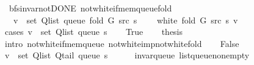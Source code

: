 \begin{isabellebody}
{\isafoldproof}%
%
\isadelimproof
\isanewline
%
\endisadelimproof
\isanewline
{}\isamarkupfalse%
\ {\isacharparenleft}{\kern0pt}\ bfs{\isacharunderscore}{\kern0pt}invar{\isacharunderscore}{\kern0pt}not{\isacharunderscore}{\kern0pt}DONE{\isacharparenright}{\kern0pt}\ not{\isacharunderscore}{\kern0pt}white{\isacharunderscore}{\kern0pt}if{\isacharunderscore}{\kern0pt}mem{\isacharunderscore}{\kern0pt}queue{\isacharunderscore}{\kern0pt}fold{\isacharcolon}{\kern0pt}\isanewline
\ \ \ {\isachardoublequoteopen}v\ {\isasymin}\ set\ {\isacharparenleft}{\kern0pt}Q{\isacharunderscore}{\kern0pt}list\ {\isacharparenleft}{\kern0pt}queue\ {\isacharparenleft}{\kern0pt}fold\ G\ src\ s{\isacharparenright}{\kern0pt}{\isacharparenright}{\kern0pt}{\isacharparenright}{\kern0pt}{\isachardoublequoteclose}\isanewline
\ \ \ {\isachardoublequoteopen}{\isasymnot}\ white\ {\isacharparenleft}{\kern0pt}fold\ G\ src\ s{\isacharparenright}{\kern0pt}\ v{\isachardoublequoteclose}\isanewline
%
\isadelimproof
%
\endisadelimproof
%
\isatagproof
{}\isamarkupfalse%
\ {\isacharparenleft}{\kern0pt}cases\ {\isachardoublequoteopen}v\ {\isasymin}\ set\ {\isacharparenleft}{\kern0pt}Q{\isacharunderscore}{\kern0pt}list\ {\isacharparenleft}{\kern0pt}queue\ s{\isacharparenright}{\kern0pt}{\isacharparenright}{\kern0pt}{\isachardoublequoteclose}{\isacharparenright}{\kern0pt}\isanewline
\ \ \isamarkupfalse%
\ True\isanewline
\ \ \isamarkupfalse%
\ {\isacharquery}{\kern0pt}thesis\isanewline
\ \ \ \ \isamarkupfalse%
\ {\isacharparenleft}{\kern0pt}intro\ not{\isacharunderscore}{\kern0pt}white{\isacharunderscore}{\kern0pt}if{\isacharunderscore}{\kern0pt}mem{\isacharunderscore}{\kern0pt}queue\ not{\isacharunderscore}{\kern0pt}white{\isacharunderscore}{\kern0pt}imp{\isacharunderscore}{\kern0pt}not{\isacharunderscore}{\kern0pt}white{\isacharunderscore}{\kern0pt}fold{\isacharparenright}{\kern0pt}\isanewline
{}\isamarkupfalse%
\isanewline
\ \ \isamarkupfalse%
\ False\isanewline
\ \ \isamarkupfalse%
\ {\isachardoublequoteopen}v\ {\isasymnotin}\ set\ {\isacharparenleft}{\kern0pt}Q{\isacharunderscore}{\kern0pt}list\ {\isacharparenleft}{\kern0pt}Q{\isacharunderscore}{\kern0pt}tail\ {\isacharparenleft}{\kern0pt}queue\ s{\isacharparenright}{\kern0pt}{\isacharparenright}{\kern0pt}{\isacharparenright}{\kern0pt}{\isachardoublequoteclose}\isanewline
\ \ \ \ \isamarkupfalse%
\ invar{\isacharunderscore}{\kern0pt}queue\ list{\isacharunderscore}{\kern0pt}queue{\isacharunderscore}{\kern0pt}non{\isacharunderscore}{\kern0pt}empty\isanewline

\end{isabellebody}
